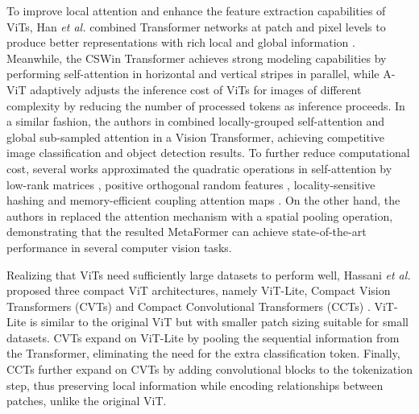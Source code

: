 \documentclass[10pt,twocolumn,letterpaper]{article}
\begin{document}
To improve local attention and enhance the feature extraction capabilities of ViTs, Han \emph{et al.} combined Transformer networks at patch and pixel levels to produce better representations with rich local and global information \cite{Author7}. Meanwhile, the CSWin Transformer \cite{Author50} achieves strong modeling capabilities by performing self-attention in horizontal and vertical stripes in parallel, while A-ViT \cite{Author49} adaptively adjusts the inference cost of ViTs for images of different complexity by reducing the number of processed tokens as inference proceeds. In a similar fashion, the authors in \cite{Author66} combined locally-grouped self-attention and global sub-sampled attention in a Vision Transformer, achieving competitive image classification and object detection results. To further reduce computational cost, several works approximated the quadratic operations in self-attention by low-rank matrices \cite{Author33}, positive orthogonal random features \cite{Author35}, locality-sensitive hashing \cite{Author34} and memory-efficient coupling attention maps \cite{Author36}. On the other hand, the authors in \cite{Author63} replaced the attention mechanism with a spatial pooling operation, demonstrating that the resulted MetaFormer can achieve state-of-the-art performance in several computer vision tasks.

Realizing that ViTs need sufficiently large datasets to perform well, Hassani \emph{et al.} proposed three compact ViT architectures, namely ViT-Lite, Compact Vision Transformers (CVTs) and Compact Convolutional Transformers (CCTs) \cite{Author1}. ViT-Lite is similar to the original ViT but with smaller patch sizing suitable for small datasets. CVTs expand on ViT-Lite by pooling the sequential information from the Transformer, eliminating the need for the extra classification token. Finally, CCTs further expand on CVTs by adding convolutional blocks to the tokenization step, thus preserving local information while encoding relationships between patches, unlike the original ViT.
\end{document}
